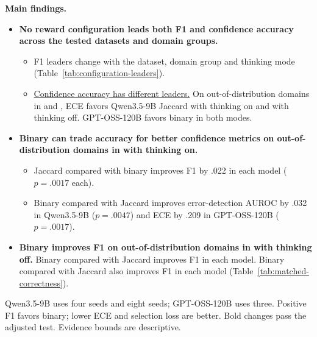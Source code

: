 \begingroup\fontsize{9.2}{10.0}\selectfont\setlength{\parskip}{0.08em}
\textbf{Main findings.}
\begin{itemize}
\item \textbf{No reward configuration leads both F1 and confidence accuracy across the tested datasets and domain groups.}
\begin{itemize}
\item F1 leaders change with the dataset, domain group and thinking mode (Table~\ref{tab:configuration-leaders}).
\item \underline{Confidence accuracy has different leaders.} On out-of-distribution domains in \SP{} and \DB{}, ECE favors Qwen3.5-9B Jaccard \armB{} with thinking on and \armD{} with thinking off. GPT-OSS-120B favors binary \armB{} in both modes.
\end{itemize}
\end{itemize}
\par
\begin{itemize}
\item \textbf{Binary can trade accuracy for better confidence metrics on out-of-distribution domains in \SP{} with thinking on.}
\begin{itemize}
\item Jaccard \armB{} compared with binary \armB{} improves F1 by .022 in each model ($p=.0017$ each).
\item Binary \armB{} compared with Jaccard \armB{} improves error-detection AUROC by .032 in Qwen3.5-9B ($p=.0047$) and ECE by .209 in GPT-OSS-120B ($p=.0017$).
\end{itemize}
\item \textbf{Binary improves F1 on out-of-distribution domains in \DB{} with thinking off.} Binary \armA{} compared with Jaccard \armA{} improves F1 in each model. Binary \armC{} compared with Jaccard \armC{} also improves F1 in each model (Table~\ref{tab:matched-correctness}).
\end{itemize}
 Qwen3.5-9B uses four \armA{} seeds and eight \armC{} seeds; GPT-OSS-120B uses three. Positive F1 favors binary; lower ECE and selection loss are better. Bold changes pass the adjusted test. Evidence bounds are descriptive.
\par\par
